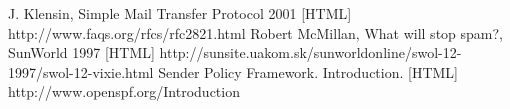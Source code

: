 \newpage
\begin{thebibliography}{99}
 J. Klensin, Simple Mail Transfer Protocol 2001 [HTML] http://www.faqs.org/rfcs/rfc2821.html 
 Robert McMillan, What will stop spam?, SunWorld 1997 [HTML] http://sunsite.uakom.sk/sunworldonline/swol-12-1997/swol-12-vixie.html
 Sender Policy Framework. Introduction.  [HTML] http://www.openspf.org/Introduction



\end{thebibliography}
